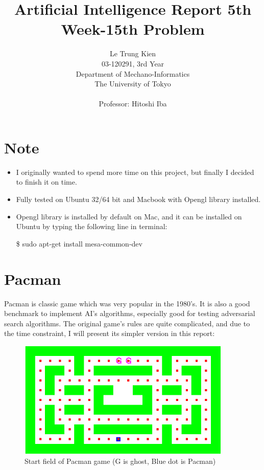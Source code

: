 \documentclass[a4paper, 11pt]{article}
\begin{document}
\title{Artificial Intelligence Report 5th Week-15th Problem}
\author{Le Trung Kien\\ 
  03-120291, 3rd Year \\
  Department of Mechano-Informatics \\ 
  The University of Tokyo \\ \\
  Professor: Hitoshi Iba
}
\maketitle

\section*{Note}
\begin{itemize}
\item I originally wanted to spend more time on this project, but finally I decided to finish it on time. 
\item Fully tested on Ubuntu 32/64 bit and Macbook with Opengl library installed.
\item Opengl library is installed by default on Mac, and it can be installed on Ubuntu by typing the following line in terminal: 
\begin{center} \$ sudo apt-get install mesa-common-dev \end{center}
\end{itemize}


\section{Pacman}

Pacman is classic game which was very popular in the 1980's. It is also a good benchmark to implement AI's algorithms, especially good for testing adversarial search algorithms. The original game's rules are quite complicated, and due to the time constraint, I will present its simpler version in this report:
\begin{figure}[hbt]
  \centering
  \includegraphics[width=4in]{field1-start}
  \caption[Close up of \textit{Hemidactylus} sp.]
  {Start field of Pacman game (G is ghost, Blue dot is Pacman)}
\end{figure}
\end{document}
